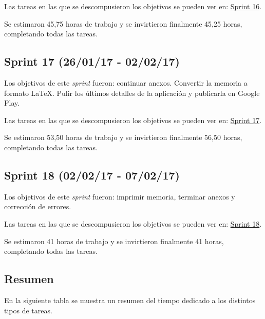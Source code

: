 Las tareas en las que se descompusieron los objetivos se pueden ver en:
\href{https://github.com/davidmigloz/go-bees/milestone/17?closed=1}{Sprint
16}.

Se estimaron 45,75 horas de trabajo y se invirtieron finalmente 45,25
horas, completando todas las tareas.


\subsection{Sprint 17 (26/01/17 -
02/02/17)}\label{sprint-17-260117---020217}

Los objetivos de este \emph{sprint} fueron: continuar anexos. Convertir
la memoria a formato LaTeX. Pulir los últimos detalles de la aplicación
y publicarla en Google Play.

Las tareas en las que se descompusieron los objetivos se pueden ver en:
\href{https://github.com/davidmigloz/go-bees/milestone/18?closed=1}{Sprint
17}.

Se estimaron 53,50 horas de trabajo y se invirtieron finalmente 56,50
horas, completando todas las tareas.


\subsection{Sprint 18 (02/02/17 -
07/02/17)}\label{sprint-18-020217---070217}

Los objetivos de este \emph{sprint} fueron: imprimir memoria, terminar
anexos y corrección de errores.

Las tareas en las que se descompusieron los objetivos se pueden ver en:
\href{https://github.com/davidmigloz/go-bees/milestone/19?closed=1}{Sprint
18}.

Se estimaron 41 horas de trabajo y se invirtieron finalmente 41 horas,
completando todas las tareas.


\subsection{Resumen}\label{resumen}

En la siguiente tabla se muestra un resumen del tiempo dedicado a los
distintos tipos de tareas.

